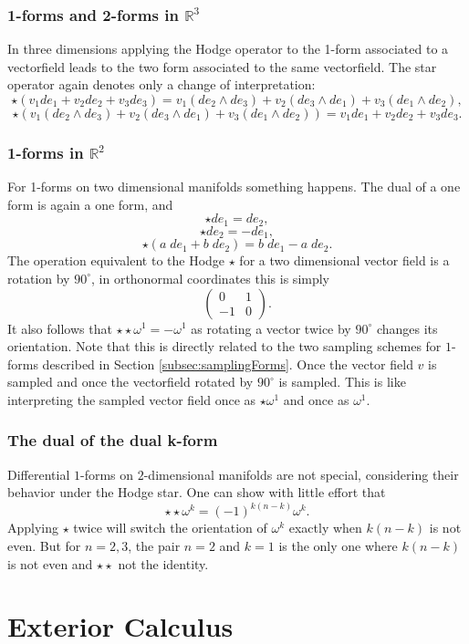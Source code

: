 \subsubsection{1-forms and 2-forms in $\mathbb R^3$}
In three dimensions applying the Hodge operator to the 1-form associated to a vectorfield leads to the two form associated to the same vectorfield. The star operator again denotes only a change of interpretation:
\[\star(v_1de_1 + v_2 de_2 + v_3 de_3) = v_1(de_2\wedge de_3) + v_2 (de_3\wedge de_1) + v_3(de_1\wedge de_2),\]
\[\star(v_1(de_2\wedge de_3) + v_2 (de_3\wedge de_1) + v_3(de_1\wedge de_2)) = v_1de_1 + v_2 de_2 + v_3 de_3.\]

\subsubsection{1-forms in $\mathbb R^2$}
For 1-forms on two dimensional manifolds something happens. The dual of a one form is again a one form, and
\[\star de_1 = de_2,\]
\[\star de_2 = -de_1,\]
\[\star(a\;de_1 + b\;de_2) = b\;de_1 -a\;de_2.\]
The operation equivalent to the Hodge $\star$ for a two dimensional vector field is a rotation by $90^\circ$, in orthonormal coordinates this is simply
\[\begin{pmatrix}
0 & 1 \\
-1 & 0
\end{pmatrix}.\]
It also follows that $\star \star \omega^1 = -\omega^1$ as rotating a vector twice by $90^\circ$ changes its orientation. Note that this is directly related to the two sampling schemes for $1$-forms described in Section \ref{subsec:samplingForms}. Once the vector field $v$ is sampled and once the vectorfield rotated by $90^\circ$ is sampled. This is like interpreting the sampled vector field once as $\star \omega^1$ and once as $\omega^1$.
\subsubsection{The dual of the dual k-form}
Differential $1$-forms on $2$-dimensional manifolds are not special, considering their behavior under the Hodge star. One can  show with little effort that
\[\star\star \omega ^k = (-1)^{k(n-k)}\omega^k.\]
Applying $\star$ twice will switch the orientation of $\omega^k$ exactly when $k(n-k)$ is not even. But for $n= 2,3$, the pair $n=2$ and $k=1$ is the only one where $k(n-k)$ is not even and $\star\star$ not the identity.


\section{Exterior Calculus}
\label{sec:EC_EC}

